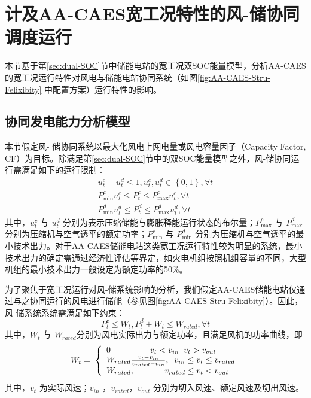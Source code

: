 \section{计及AA-CAES宽工况特性的风-储协同调度运行}
\label{sec:chap3-wind-ESS-operation}
本节基于第\ref{sec:dual-SOC}节中储能电站的宽工况双SOC能量模型，分析AA-CAES的宽工况运行特性对风电与储能电站协同系统（如图\ref{fig:AA-CAES-Stru-Felixibity} 中配置方案）运行特性的影响。

\subsection{协同发电能力分析模型}
本节假定风- 储协同系统以最大化风电上网电量或风电容量因子（Capacity Factor, CF）为目标。除满足第\ref{sec:dual-SOC}节中的双SOC能量模型之外，风-储协同运行需满足如下的运行限制\cite{CAES-Wind-Rui-19}：
\begin{subequations}
\label{eq:WT-CAES-Power-Limit}
\begin{gather}
u_t^c + u_t^d \le 1,u_t^c,u_t^d \in \left\{ {0,1} \right\}, \forall t\\
P_{\min }^cu_t^c \le P_t^c \le P_{\max }^cu_t^c, \forall t \\
 P_{\min }^du_t^d \le P_t^d \le P_{\max }^du_t^d, \forall t
\end{gather}
\end{subequations}
其中，$u_t^c$ 与 $u_t^d$ 分别为表示压缩储能与膨胀释能运行状态的布尔量；$P_{\max }^c$ 与 $P_{\max }^d$ 分别为压缩机与空气透平的额定功率；$P_{\min }^c$ 与 $P_{\min }^d$ 分别为压缩机与空气透平的最小技术出力。对于AA-CAES储能电站这类宽工况运行特性较为明显的系统，最小技术出力的确定需通过经济性评估等界定，如火电机组按照机组容量的不同，大型机组的最小技术出力一般设定为额定功率的50\%。

为了聚焦于宽工况运行对风-储系统影响的分析，我们假定AA-CAES储能电站仅通过与之协同运行的风电进行储能（参见图\ref{fig:AA-CAES-Stru-Felixibity}）。因此，风-储系统系统需满足如下约束：
\begin{equation}
\label{eq:WT-Power-Limit}
P_t^c \le {W_t},P_t^d + {W_t} \le {W_{rated}},\forall t
\end{equation}
其中，$W_t$ 与 $W_{rated}$分别为风电实际出力与额定功率，且满足风机的功率曲线，即
\begin{equation}
\label{eq:WT-Power-Curve}
{W_t} = \;\left\{ \begin{array}{l}
{\rm{0}}\;\;\;\;\;\;\;\;\;\;\;\;\;\;\;\;\;{v_t} < {v_{in}}\;\;{v_t} > {v_{out}}\\
{W_{rated}}\frac{{{v_t} - {v_{in}}}}{{{v_{rated}} - {v_{in}}}},\;\;{v_{in}} \le {v_t} \le {v_{rated}}\\
{W_{rated}},\;\;\;\;\;\;\;\;\;\;\;\;\;{v_{rated}} \le {v_t} < {v_{out}}
\end{array} \right.
\end{equation}
其中，$v_t$ 为实际风速；$v_{in}$ ，$v_{rated}$，$v_{out}$ 分别为切入风速、额定风速及切出风速。

